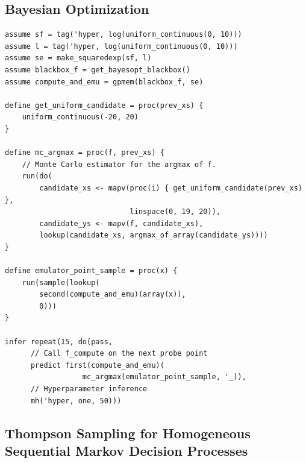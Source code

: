 \documentclass[a0,portrait]{a0poster}
\begin{document}
\begin{multicols}{3}
\section*{Bayesian Optimization}

\begin{minipage}{\linewidth}
\begin{lstlisting}[frame=single,label=alg:structureVent,caption=Venture Code for Bayesian Optimization,mathescape]
assume sf = tag('hyper, log(uniform_continuous(0, 10)))
assume l = tag('hyper, log(uniform_continuous(0, 10)))
assume se = make_squaredexp(sf, l)
assume blackbox_f = get_bayesopt_blackbox()
assume compute_and_emu = gpmem(blackbox_f, se)

define get_uniform_candidate = proc(prev_xs) {
    uniform_continuous(-20, 20)
}

define mc_argmax = proc(f, prev_xs) {
    // Monte Carlo estimator for the argmax of f.
    run(do(
        candidate_xs <- mapv(proc(i) { get_uniform_candidate(prev_xs) },
                             linspace(0, 19, 20)),
        candidate_ys <- mapv(f, candidate_xs),
        lookup(candidate_xs, argmax_of_array(candidate_ys))))
}

define emulator_point_sample = proc(x) {
    run(sample(lookup(
        second(compute_and_emu)(array(x)),
        0)))
}

infer repeat(15, do(pass,
      // Call f_compute on the next probe point
      predict first(compute_and_emu)(
                  mc_argmax(emulator_point_sample, '_)),
      // Hyperparameter inference
      mh('hyper, one, 50)))
\end{lstlisting}
\end{minipage}
      
\subsection*{Thompson Sampling for Homogeneous Sequential Markov Decision Processes}




\end{multicols}
\end{document}

